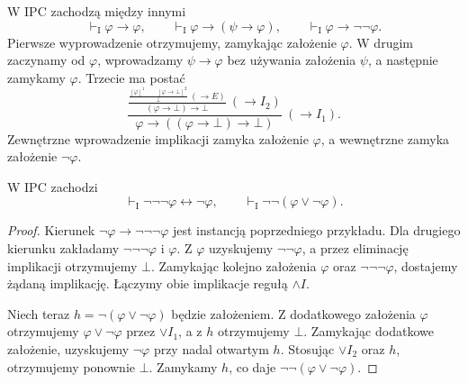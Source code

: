 \begin{przyklad}
\label{ex:ncl-ipc-basic-proofs}
W IPC zachodzą między innymi
\[
 \vdash_{\mathrm I}\varphi\to\varphi,\qquad
 \vdash_{\mathrm I}\varphi\to(\psi\to\varphi),
 \qquad
 \vdash_{\mathrm I}\varphi\to\neg\neg\varphi.
\]
Pierwsze wyprowadzenie otrzymujemy, zamykając
założenie $\varphi$. W drugim zaczynamy od
$\varphi$, wprowadzamy $\psi\to\varphi$ bez
używania założenia $\psi$, a następnie zamykamy
$\varphi$. Trzecie ma postać
\[
 \frac{
   \frac{
     \frac{[\varphi]^1\qquad[\varphi\to\bot]^2}
          {\bot}\ (\to E)
   }{(\varphi\to\bot)\to\bot}\ (\to I_2)
 }{\varphi\to((\varphi\to\bot)\to\bot)}\ (\to I_1).
\]
Zewnętrzne wprowadzenie implikacji zamyka założenie $\varphi$,
a wewnętrzne zamyka założenie $\neg\varphi$.
\end{przyklad}

\begin{stwierdzenie}
\label{prop:ncl-ipc-triple-negation}
W IPC zachodzi
\[
 \vdash_{\mathrm I}\neg\neg\neg\varphi
       \leftrightarrow\neg\varphi,\qquad
 \vdash_{\mathrm I}\neg\neg(\varphi\vee\neg\varphi).
\]
\end{stwierdzenie}
\begin{proof}
Kierunek $\neg\varphi\to\neg\neg\neg\varphi$
jest instancją poprzedniego przykładu.
Dla drugiego kierunku zakładamy
$\neg\neg\neg\varphi$ i $\varphi$.
Z $\varphi$ uzyskujemy $\neg\neg\varphi$,
a przez eliminację implikacji otrzymujemy $\bot$.
Zamykając kolejno założenia $\varphi$ oraz
$\neg\neg\neg\varphi$, dostajemy żądaną implikację.
Łączymy obie implikacje regułą $\wedge I$.

Niech teraz $h=\neg(\varphi\vee\neg\varphi)$
będzie założeniem. Z dodatkowego założenia
$\varphi$ otrzymujemy $\varphi\vee\neg\varphi$
przez $\vee I_1$, a z $h$ otrzymujemy $\bot$.
Zamykając dodatkowe założenie, uzyskujemy
$\neg\varphi$ przy nadal otwartym $h$.
Stosując $\vee I_2$ oraz $h$, otrzymujemy ponownie
$\bot$. Zamykamy $h$, co daje
$\neg\neg(\varphi\vee\neg\varphi)$.
\end{proof}

